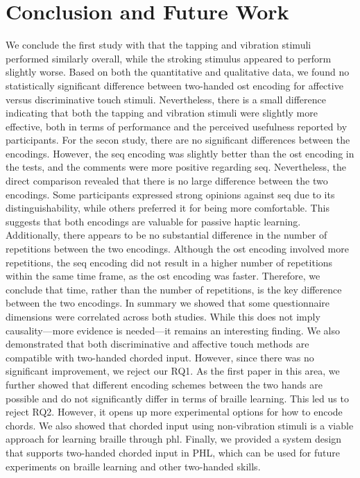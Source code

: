 \chapter{Conclusion and Future Work}
\label{ch:conclusion}

We conclude the first study with that the tapping and vibration stimuli performed similarly overall, while the stroking stimulus appeared to perform slightly worse. Based on both the quantitative and qualitative data, we found no statistically significant difference between two-handed \gls{ost} encoding for affective versus discriminative touch stimuli. Nevertheless, there is a small difference indicating that both the tapping and vibration stimuli were slightly more effective, both in terms of performance and the perceived usefulness reported by participants.
For the secon study, there are no significant differences between the encodings. However, the \gls{seq} encoding was slightly better than the \gls{ost} encoding in the tests, and the comments were more positive regarding \gls{seq}. Nevertheless, the direct comparison revealed that there is no large difference between the two encodings. Some participants expressed strong opinions against \gls{seq} due to its distinguishability, while others preferred it for being more comfortable. This suggests that both encodings are valuable for passive haptic learning. Additionally, there appears to be no substantial difference in the number of repetitions between the two encodings. Although the \gls{ost} encoding involved more repetitions, the \gls{seq} encoding did not result in a higher number of repetitions within the same time frame, as the \gls{ost} encoding was faster. Therefore, we conclude that time, rather than the number of repetitions, is the key difference between the two encodings.
In summary we showed that some questionnaire dimensions were correlated across both studies. While this does not imply causality—more evidence is needed—it remains an interesting finding.
We also demonstrated that both discriminative and affective touch methods are compatible with two-handed chorded input. However, since there was no significant improvement, we reject our RQ1.
As the first paper in this area, we further showed that different encoding schemes between the two hands are possible and do not significantly differ in terms of braille learning. This led us to reject RQ2. However, it opens up more experimental options for how to encode chords.
We also showed that chorded input using non-vibration stimuli is a viable approach for learning braille through \gls{phl}. Finally, we provided a system design that supports two-handed chorded input in PHL, which can be used for future experiments on braille learning and other two-handed skills.
